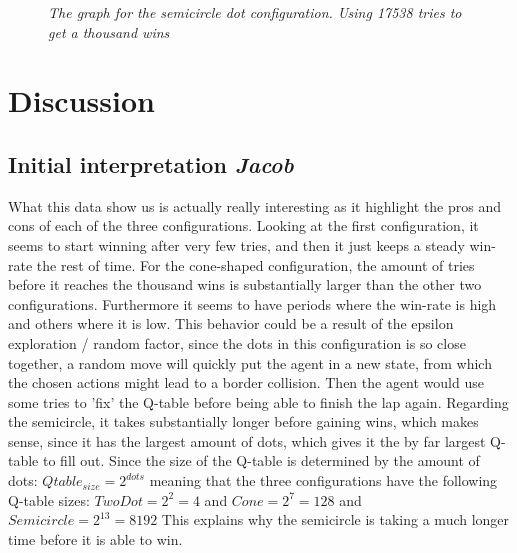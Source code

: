 \begin{figure}[H]
    \caption{\textit{The graph for the semicircle dot configuration. Using 17538 tries to get a thousand wins}}
\end{figure}


\vspace{3mm}
\section{Discussion}
\vspace{3mm}
\subsection{Initial interpretation  \vspace{0.5mm} \small\textit{Jacob}}
What this data show us is actually really interesting as it highlight the pros and cons of each of the three configurations. Looking at the first configuration, it seems to start winning after very few tries, and then it just keeps a steady win-rate the rest of time. For the cone-shaped configuration, the amount of tries before it reaches the thousand wins is substantially larger than the other two configurations. Furthermore it seems to have periods where the win-rate is high and others where it is low. This behavior could be a result of the epsilon exploration / random factor, since the dots in this configuration is so close together, a random move will quickly put the agent in a new state, from which the chosen actions might lead to a border collision. Then the agent would use some tries to 'fix' the Q-table before being able to finish the lap again. Regarding the semicircle, it takes substantially longer before gaining wins, which makes sense, since it has the largest amount of dots, which gives it the by far largest Q-table to fill out. Since the size of the Q-table is determined by the amount of dots: $Qtable_{size}=2^{dots}$ meaning that the three configurations have the following Q-table sizes: $TwoDot = 2^2=4$ and $Cone = 2^7=128$ and $Semicircle = 2^{13}=8192$ This explains why the semicircle is taking a much longer time before it is able to win. 

